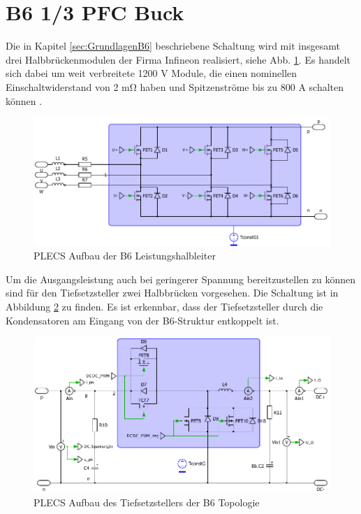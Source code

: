 \section{B6 1/3 PFC Buck}
Die in Kapitel \ref{sec:GrundlagenB6} beschriebene Schaltung wird mit insgesamt drei Halbbrückenmodulen der Firma Infineon realisiert, siehe Abb. \ref{fig:plecsb6}. Es handelt sich dabei um weit verbreitete 1200 \si{\volt} Module, die einen nominellen Einschaltwiderstand von 2 \si{\milli \ohm} haben und Spitzenströme bis zu 800 \si{\ampere} schalten können \cite{IFAGFF2}.
\begin{figure}[H]
	\centering
	\includegraphics[width=1\linewidth]{content/Grafiken/PLECS_B6}
	\caption{PLECS Aufbau der B6 Leistungshalbleiter}
	\label{fig:plecsb6}
\end{figure}
 Um die Ausgangsleistung auch bei geringerer Spannung bereitzustellen zu können sind für den Tiefsetzsteller zwei Halbbrücken vorgesehen. Die Schaltung ist in Abbildung \ref{fig:plecsb6buck} zu finden. Es ist erkennbar, dass der Tiefsetzsteller durch die Kondensatoren am Eingang von der B6-Struktur entkoppelt ist.
 \begin{figure}[H]
 	\centering
 	\includegraphics[width=0.9\linewidth]{content/Grafiken/PLECS_B6Buck}
 	\caption{PLECS Aufbau des Tiefsetzstellers der B6 Topologie}
 	\label{fig:plecsb6buck}
 \end{figure}
 

